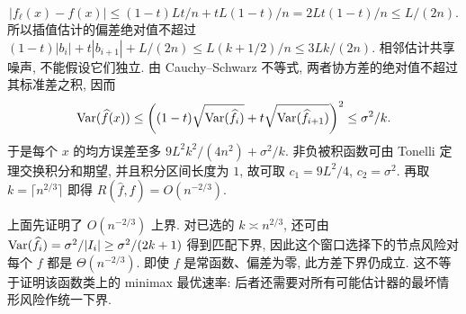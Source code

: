 \begin{solution}
\begin{enumerate}[label=\arabic*.]
\[
|f_\ell(x)-f(x)|\le (1-t)Lt/n+tL(1-t)/n
=2Lt(1-t)/n\le L/(2n).
\]
所以插值估计的偏差绝对值不超过 $(1-t)|b_i|+t|b_{i+1}|+L/(2n)\le L(k+1/2)/n\le3Lk/(2n)$. 相邻估计共享噪声, 不能假设它们独立. 由 Cauchy--Schwarz 不等式, 两者协方差的绝对值不超过其标准差之积, 因而
\[
\operatorname{Var}(\widehat f(x))\le
\left((1-t)\sqrt{\operatorname{Var}(\widehat f_i)}+t\sqrt{\operatorname{Var}(\widehat f_{i+1})}\right)^2
\le\sigma^2/k.
\]
于是每个 $x$ 的均方误差至多 $9L^2k^2/(4n^2)+\sigma^2/k$. 非负被积函数可由 Tonelli 定理交换积分和期望, 并且积分区间长度为 $1$, 故可取 $c_1=9L^2/4$, $c_2=\sigma^2$. 再取 $k=\lceil n^{2/3}\rceil$ 即得 $R(\widehat f,f)=O(n^{-2/3})$.
\end{enumerate}
\end{solution}
\begin{remark}
上面先证明了 $O(n^{-2/3})$ 上界. 对已选的 $k\asymp n^{2/3}$, 还可由 $\operatorname{Var}(\widehat f_i)=\sigma^2/|I_i|\ge\sigma^2/(2k+1)$ 得到匹配下界, 因此这个窗口选择下的节点风险对每个 $f$ 都是 $\Theta(n^{-2/3})$. 即使 $f$ 是常函数、偏差为零, 此方差下界仍成立. 这不等于证明该函数类上的 minimax 最优速率: 后者还需要对所有可能估计器的最坏情形风险作统一下界.
\end{remark}

